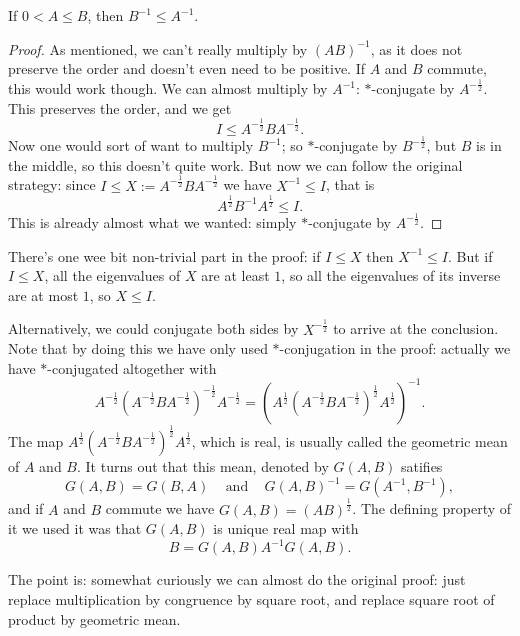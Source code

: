 \begin{lause}
	If $0 < A \leq B$, then $B^{-1} \leq A^{-1}$.
\end{lause}
\begin{proof}
	As mentioned, we can't really multiply by $(A B)^{-1}$, as it does not preserve the order and doesn't even need to be positive. If $A$ and $B$ commute, this would work though. We can almost multiply by $A^{-1}$: $*$-conjugate by $A^{-\frac{1}{2}}$. This preserves the order, and we get
	\[
		I \leq A^{-\frac{1}{2}} B A^{-\frac{1}{2}}.
	\]
	Now one would sort of want to multiply $B^{-1}$; so $*$-conjugate by $B^{-\frac{1}{2}}$, but $B$ is in the middle, so this doesn't quite work. But now we can follow the original strategy: since $I \leq X := A^{-\frac{1}{2}} B A^{-\frac{1}{2}}$ we have $X^{-1} \leq I$, that is
	\[
		A^{\frac{1}{2}} B^{-1} A^{\frac{1}{2}} \leq I.
	\]
	This is already almost what we wanted: simply $*$-conjugate by $A^{-\frac{1}{2}}$.
\end{proof}

There's one wee bit non-trivial part in the proof: if $I \leq X$ then $X^{-1} \leq I$. But if $I \leq X$, all the eigenvalues of $X$ are at least $1$, so all the eigenvalues of its inverse are at most $1$, so $X \leq I$.

\begin{huom}

Alternatively, we could conjugate both sides by $X^{-\frac{1}{2}}$ to arrive at the conclusion. Note that by doing this we have only used $*$-conjugation in the proof: actually we have $*$-conjugated altogether with 
\[
	A^{-\frac{1}{2}} (A^{-\frac{1}{2}}B A^{-\frac{1}{2}})^{-\frac{1}{2}} A^{-\frac{1}{2}} = (A^{\frac{1}{2}} (A^{-\frac{1}{2}}B A^{-\frac{1}{2}})^{\frac{1}{2}} A^{\frac{1}{2}})^{-1}.
\]
The map $A^{\frac{1}{2}} (A^{-\frac{1}{2}}B A^{-\frac{1}{2}})^{\frac{1}{2}} A^{\frac{1}{2}}$, which is real, is usually called the geometric mean of $A$ and $B$. It turns out that this mean, denoted by $G(A, B)$ satifies
\[
	G(A, B) = G(B, A) \;\;\; \text{ and } \;\;\; G(A, B)^{-1} = G(A^{-1}, B^{-1}),
\]
and if $A$ and $B$ commute we have $G(A, B) = (A B)^{\frac{1}{2}}$. The defining property of it we used it was that $G(A, B)$ is unique real map with
\[
	B = G(A, B) A^{-1} G(A, B).
\]

The point is: somewhat curiously we can almost do the original proof: just replace multiplication by congruence by square root, and replace square root of product by geometric mean.

\end{huom}

